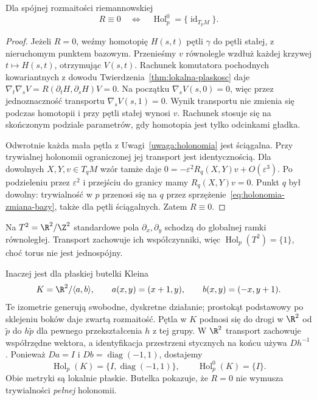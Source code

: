 \begin{stwierdzenie}
\label{prop:holonomia-plaskosc}
Dla spójnej rozmaitości riemannowskiej
\[
 R\equiv0\quad\Longleftrightarrow\quad
 \operatorname{Hol}^0_p=\{\operatorname{id}_{T_pM}\}.
\]
\end{stwierdzenie}
\begin{proof}
Jeżeli $R=0$, weźmy homotopię $H(s,t)$ pętli $\gamma$
do pętli stałej, z nieruchomym punktem bazowym.
Przenieśmy $v$ równolegle wzdłuż każdej krzywej
$t\mapsto H(s,t)$, otrzymując $V(s,t)$.
Rachunek komutatora pochodnych kowariantnych
z dowodu Twierdzenia~\ref{thm:lokalna-plaskosc} daje
$\nabla_t\nabla_sV=R(\partial_tH,\partial_sH)V=0$.
Na początku $\nabla_sV(s,0)=0$, więc przez jednoznaczność
transportu $\nabla_sV(s,1)=0$. Wynik transportu nie
zmienia się podczas homotopii i przy pętli stałej
wynosi $v$. Rachunek stosuje się na skończonym podziale
parametrów, gdy homotopia jest tylko odcinkami gładka.

Odwrotnie każda mała pętla z Uwagi~\ref{uwaga:holonomia}
jest ściągalna. Przy trywialnej holonomii ograniczonej
jej transport jest identycznością. Dla dowolnych
$X,Y,v\in T_qM$ wzór tamże daje
$0=-\varepsilon^2R_q(X,Y)v+O(\varepsilon^3)$.
Po podzieleniu przez $\varepsilon^2$ i przejściu
do granicy mamy $R_q(X,Y)v=0$. Punkt $q$ był dowolny:
trywialność w $p$ przenosi się na $q$ przez
sprzężenie~\eqref{eq:holonomia-zmiana-bazy}, także
dla pętli ściągalnych. Zatem $R\equiv0$.
\end{proof}

\begin{przyklad}
\label{prz:holonomia-torus-klein}
Na $T^2=\R^2/\Z^2$ standardowe pola $\partial_x,\partial_y$
schodzą do globalnej ramki równoległej. Transport zachowuje
ich współczynniki, więc $\operatorname{Hol}_p(T^2)=\{1\}$,
choć torus nie jest jednospójny.

Inaczej jest dla płaskiej butelki Kleina
\[
 K=\R^2/\langle a,b\rangle,
 \qquad a(x,y)=(x+1,y),\qquad b(x,y)=(-x,y+1).
\]
Te izometrie generują swobodne, dyskretne działanie;
prostokąt podstawowy po sklejeniu boków daje zwartą
rozmaitość. Pętla w $K$ podnosi się do drogi w $\R^2$
od $\widetilde p$ do $h\widetilde p$ dla pewnego
przekształcenia $h$ z tej grupy. W $\R^2$ transport
zachowuje współrzędne wektora, a identyfikacja przestrzeni
stycznych na końcu używa $D h^{-1}$. Ponieważ
$Da=I$ i $Db=\operatorname{diag}(-1,1)$, dostajemy
\[
 \operatorname{Hol}_p(K)
   =\{I,\operatorname{diag}(-1,1)\},
 \qquad \operatorname{Hol}^0_p(K)=\{I\}.
\]
Obie metryki są lokalnie płaskie. Butelka pokazuje,
że $R=0$ nie wymusza trywialności \emph{pełnej}
holonomii.
\end{przyklad}

